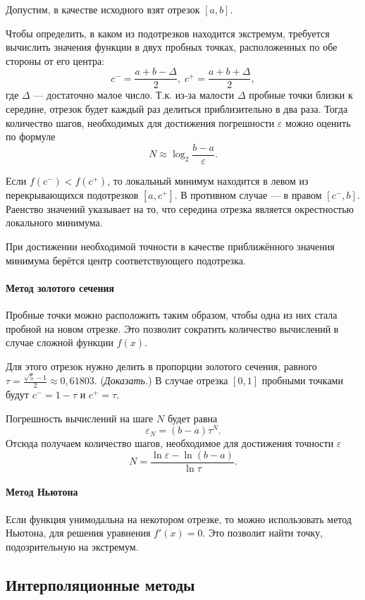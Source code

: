 Допустим, в качестве исходного взят отрезок $[a,b]$. 

Чтобы определить, в каком из подотрезков находится экстремум, требуется
вычислить значения функции в двух пробных точках, расположенных по
обе стороны от его центра:
\[
c^{-}=\frac{a+b-\Delta}{2},\; c^{+}=\frac{a+b+\Delta}{2},
\]
где $\Delta$ — достаточно малое число. Т.к. из-за малости $\Delta$
пробные точки близки к середине, отрезок будет каждый раз делиться
приблизительно в два раза. Тогда количество шагов, необходимых для
достижения погрешности $\varepsilon$ можно оценить по формуле
\[
N\approx\log_{2}\frac{b-a}{\varepsilon}.
\]


Если $f(c^{-})<f(c^{+})$, то локальный минимум находится в левом
из перекрывающихся подотрезков $[a,c^{+}]$. В противном случае —
в правом $[c^{-},b]$. Раенство значений указывает на то, что середина
отрезка является окрестностью локального минимума.

При достижении необходимой точности в качестве приближённого значения
минимума берётся центр соответствующего подотрезка.


\paragraph{Метод золотого сечения}

Пробные точки можно расположить таким образом, чтобы одна из них стала
пробной на новом отрезке. Это позволит сократить количество вычислений
в случае сложной функции $f(x).$

Для этого отрезок нужно делить в пропорции золотого сечения, равного
$\tau=\frac{\sqrt{5}-1}{2}\approx0{,}61803.$ (\emph{Доказать.}) В
случае отрезка $[0,1]$ пробными точками будут $c^{-}=1-\tau$ и $c^{+}=\tau$.

Погрешность вычислений на шаге $N$ будет равна
\[
\varepsilon_{N}=(b-a)\tau^{N}.
\]
Отсюда получаем количество шагов, необходимое для достижения точности
$\varepsilon$
\[
N=\frac{\ln\varepsilon-\ln(b-a)}{\ln\tau}.
\]



\paragraph{Метод Ньютона}

Если функция унимодальна на некотором отрезке, то можно использовать
метод Ньютона, для решения уравнения $f'(x)=0.$ Это позволит найти
точку, подозрительную на экстремум.


\subsection{Интерполяционные методы}


